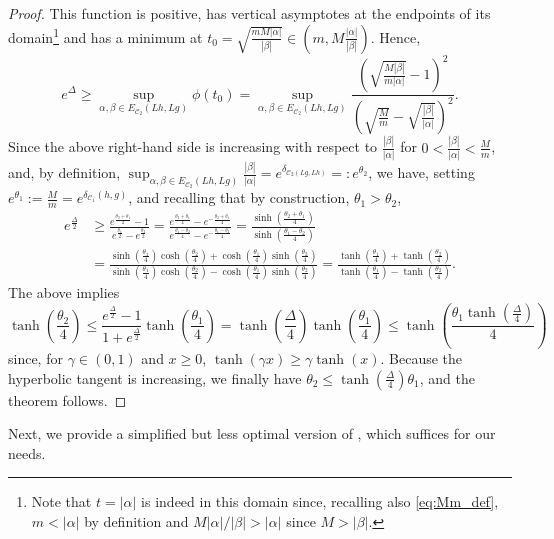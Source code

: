 \documentclass{amsart}
\numberwithin{equation}{section}
\newcommand\cC{{\mathcal C}}
\begin{document}
\begin{proof}
This function is positive, has vertical asymptotes at the endpoints of its domain\footnote{Note that
$t = |\alpha|$ is indeed in this domain since, recalling also \eqref{eq:Mm_def}, $m < |\alpha|$ by definition and $M|\alpha|/|\beta| > |\alpha|$ since $M > |\beta|$.}  and has a minimum at $t_0=\sqrt{\frac{m M|\alpha|}{|\beta|}}\in (m,M \frac{|\alpha|}{|\beta|})$. 
Hence,
\[
e^\Delta\geq  \sup_{\alpha,\beta\in E_{\cC_2}(Lh,Lg)} \phi(t_0)=\sup_{\alpha,\beta\in E_{\cC_2}(Lh,Lg)}\frac{\left(\sqrt{\frac{M|\beta|}{m|\alpha|}}-1\right)^2}{\left(\sqrt{\frac M m}-\sqrt{\frac{|\beta|}{|\alpha|}}\right)^2}.
\]
Since the above right-hand side is increasing with respect to $\frac{|\beta|}{|\alpha|}$ for $0<\frac{|\beta|}{|\alpha|} <\frac M m$, and, by definition, $ \sup_{\alpha,\beta\in E_{\cC_2}(Lh,Lg)}\frac{|\beta|}{|\alpha|}= e^{\delta_{\cC_2(Lg,Lh)}}=:e^{\theta_2}$, we have, setting 
$e^{\theta_1}:= \frac{M}{m} = e^{\delta_{\cC_1}(h,g)}$, and recalling that by construction, $\theta_1 > \theta_2$,
\[
\begin{split}
e^{\frac{\Delta}2}&\geq \frac{e^{\frac{\theta_2+\theta_1}2}-1}{e^{\frac{\theta_1}2}-e^{\frac{\theta_2}2}}
=\frac{e^{\frac{\theta_2+\theta_1}4}-e^{-\frac{\theta_2+\theta_1}4}}{e^{\frac{\theta_1-\theta_2}4}-e^{-\frac{\theta_1-\theta_2}4}}=\frac{\sinh\left(\frac{\theta_2+\theta_1}4\right)}{\sinh\left(\frac{\theta_1-\theta_2}4\right)}\\
&=\frac{\sinh\left(\frac{\theta_1}4\right)\cosh\left(\frac{\theta_2}4\right)+\cosh\left(\frac{\theta_1}4\right)\sinh\left(\frac{\theta_2}4\right)}{\sinh\left(\frac{\theta_1}4\right)\cosh\left(\frac{\theta_2}4\right)-\cosh\left(\frac{\theta_1}4\right)\sinh\left(\frac{\theta_2}4\right)}=\frac{\tanh\left(\frac{\theta_1}4\right)+\tanh\left(\frac{\theta_2}4\right)}{\tanh\left(\frac{\theta_1}4\right)-\tanh\left(\frac{\theta_2}4\right)}.
\end{split}
\]
The above implies 
\[
\tanh\left(\frac{\theta_2}4\right)\leq \frac{e^{\frac{\Delta}2}-1}{1+e^{\frac{\Delta}2}}\tanh\left(\frac{\theta_1}4\right)
=\tanh\left(\frac{\Delta}4\right)\tanh\left(\frac{\theta_1}4\right)
\leq \tanh\left(\frac{ \theta_1  \tanh\left(\frac{\Delta}4\right)}4\right)
\]
since, for $\gamma\in (0,1)$ and $x\geq 0$, $\tanh(\gamma x)\geq \gamma\tanh(x)$. Because the hyperbolic tangent is increasing, we finally have $\theta_2\leq\tanh\left(\frac{\Delta}4\right)\theta_1$,
and the theorem follows.
\end{proof}

Next, we provide a simplified but less optimal version of \cite[Theorem 4.5]{Du11}, which suffices for our needs.
\end{document}
